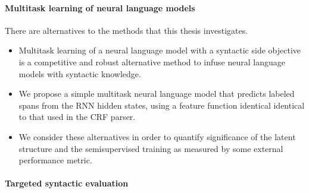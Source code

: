 \paragraph{Multitask learning of neural language models}
  There are alternatives to the methods that this thesis investigates.
  \begin{itemize}

    \item Multitask learning of a neural language model with a syntactic side objective is a competitive and robust alternative method to infuse neural language models with syntactic knowledge.


    \item We propose a simple multitask neural language model that predicts labeled spans from the RNN hidden states, using a feature function identical identical to that used in the CRF parser.

    \item We consider these alternatives in order to quantify significance of the latent structure and the semisupervised training as measured by some external performance metric.

  \end{itemize}

\paragraph{Targeted syntactic evaluation}

